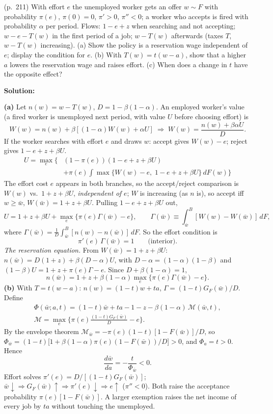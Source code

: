 \documentclass[12pt, letterpaper]{article}
\newcommand{\wb}{\bar w}
\begin{document}
\begin{tcolorbox}[oddbox,title={Exercise 6.11 \quad Pissarides: Taxation and Variable Search Intensity}]
\begin{tcolorbox}[questionbox]
(p.~211) With effort $e$ the unemployed worker gets an offer $w\sim F$ with probability $\pi(e)$, $\pi(0)=0$,
$\pi'>0$, $\pi''<0$; a worker who accepts is fired with probability $\alpha$ per period. Flows: $1-e+z$ when searching
and not accepting; $w-e-T(w)$ in the first period of a job; $w-T(w)$ afterwards (taxes $T$, $w-T(w)$
increasing). (a) Show the policy is a reservation wage independent of $e$; display the condition for
$e$. (b) With $T(w)=t(w-a)$, show that a higher $a$ lowers the reservation wage and raises effort.
(c) When does a change in $t$ have the opposite effect?
\end{tcolorbox}

\textbf{Solution:}

\textbf{(a)} Let $n(w)=w-T(w)$, $D=1-\beta(1-\alpha)$. An employed worker's value (a fired worker is unemployed
next period, with value $U$ before choosing effort) is
\[
W(w)=n(w)+\beta[(1-\alpha)W(w)+\alpha U]\;\Longrightarrow\;W(w)=\frac{n(w)+\beta\alpha U}{D}.
\]
If the worker searches with effort $e$ and draws $w$: accept gives $W(w)-e$; reject gives $1-e+z+\beta U$.
\[
\boxed{\begin{aligned}U=\max_{e}\Big\{&(1-\pi(e))(1-e+z+\beta U)\\&+\pi(e)\int\max\{W(w)-e,\;1-e+z+\beta U\}\,dF(w)\Big\}\end{aligned}}
\]
The effort cost $e$ appears in both branches, so the accept/reject comparison is $W(w)$ vs.\ $1+z+\beta U$,
\emph{independent of $e$}; $W$ is increasing (as $n$ is), so accept iff $w\ge\wb$, $W(\wb)=1+z+\beta U$. Pulling
$1-e+z+\beta U$ out,
\[
U=1+z+\beta U+\max_e\big\{\pi(e)\Gamma(\wb)-e\big\},\qquad \Gamma(\wb)\equiv\int_{\wb}^B[W(w)-W(\wb)]\,dF,
\]
where $\Gamma(\wb)=\frac1D\int_{\wb}^B[n(w)-n(\wb)]\,dF$. So the effort condition is
\[
\boxed{\pi'(e)\,\Gamma(\wb)=1}\qquad\text{(interior)}.
\]
\emph{The reservation equation.} From $W(\wb)=1+z+\beta U$: $n(\wb)=D(1+z)+\beta(D-\alpha)U$, with $D-\alpha=(1-\alpha)(1-\beta)$ and
$(1-\beta)U=1+z+\pi(e)\Gamma-e$. Since $D+\beta(1-\alpha)=1$,
\[
n(\wb)=1+z+\beta(1-\alpha)\max_e\{\pi(e)\Gamma(\wb)-e\}.
\]
\textbf{(b)} With $T=t(w-a)$: $n(w)=(1-t)w+ta$, $\Gamma=(1-t)G_F(\wb)/D$. Define
\[
\begin{gathered}\Phi(\wb;a,t)=(1-t)\wb+ta-1-z-\beta(1-\alpha)\,\mathcal M(\wb,t),\\ \mathcal M=\max_e\Big\{\pi(e)\frac{(1-t)G_F(\wb)}{D}-e\Big\}.\end{gathered}
\]
By the envelope theorem $\mathcal M_{\wb}=-\pi(e)(1-t)[1-F(\wb)]/D$, so
$\Phi_{\wb}=(1-t)\big[1+\beta(1-\alpha)\pi(e)(1-F(\wb))/D\big]>0$, and $\Phi_a=t>0$. Hence
\[
\frac{d\wb}{da}=-\frac{t}{\Phi_{\wb}}<0 .
\]
Effort solves $\pi'(e)=D/[(1-t)G_F(\wb)]$; $\wb\downarrow\Rightarrow G_F(\wb)\uparrow\Rightarrow\pi'(e)\downarrow\Rightarrow e\uparrow$ ($\pi''<0$). Both raise
the acceptance probability $\pi(e)[1-F(\wb)]$. A larger exemption raises the net income of every job by $ta$
without touching the unemployed.


\end{tcolorbox}
\end{document}
